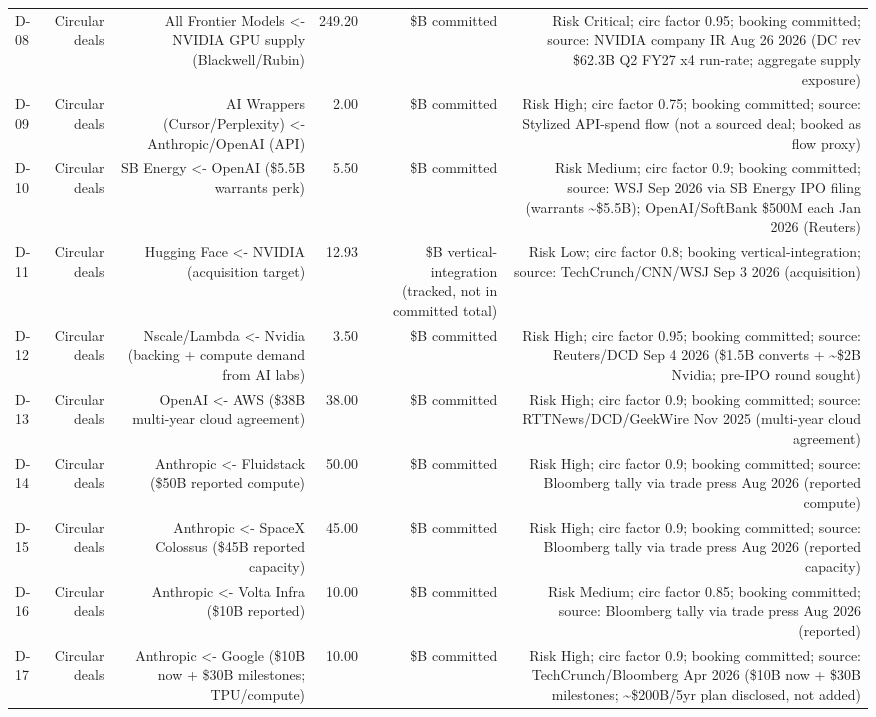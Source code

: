 \begin{tabular}{@{}lrrrrr@{}}
D-08 & Circular deals & All Frontier Models <- NVIDIA GPU supply (Blackwell/Rubin) & 249.20 & \$B committed & Risk Critical; circ factor 0.95; booking committed; source: NVIDIA company IR Aug 26 2026 (DC rev \$62.3B Q2 FY27 x4 run-rate; aggregate supply exposure) \\
D-09 & Circular deals & AI Wrappers (Cursor/Perplexity) <- Anthropic/OpenAI (API) & 2.00 & \$B committed & Risk High; circ factor 0.75; booking committed; source: Stylized API-spend flow (not a sourced deal; booked as flow proxy) \\
D-10 & Circular deals & SB Energy <- OpenAI (\$5.5B warrants perk) & 5.50 & \$B committed & Risk Medium; circ factor 0.9; booking committed; source: WSJ Sep 2026 via SB Energy IPO filing (warrants \textasciitilde{}\$5.5B); OpenAI/SoftBank \$500M each Jan 2026 (Reuters) \\
D-11 & Circular deals & Hugging Face <- NVIDIA (acquisition target) & 12.93 & \$B vertical-integration (tracked, not in committed total) & Risk Low; circ factor 0.8; booking vertical-integration; source: TechCrunch/CNN/WSJ Sep 3 2026 (acquisition) \\
D-12 & Circular deals & Nscale/Lambda <- Nvidia (backing + compute demand from AI labs) & 3.50 & \$B committed & Risk High; circ factor 0.95; booking committed; source: Reuters/DCD Sep 4 2026 (\$1.5B converts + \textasciitilde{}\$2B Nvidia; pre-IPO round sought) \\
D-13 & Circular deals & OpenAI <- AWS (\$38B multi-year cloud agreement) & 38.00 & \$B committed & Risk High; circ factor 0.9; booking committed; source: RTTNews/DCD/GeekWire Nov 2025 (multi-year cloud agreement) \\
D-14 & Circular deals & Anthropic <- Fluidstack (\$50B reported compute) & 50.00 & \$B committed & Risk High; circ factor 0.9; booking committed; source: Bloomberg tally via trade press Aug 2026 (reported compute) \\
D-15 & Circular deals & Anthropic <- SpaceX Colossus (\$45B reported capacity) & 45.00 & \$B committed & Risk High; circ factor 0.9; booking committed; source: Bloomberg tally via trade press Aug 2026 (reported capacity) \\
D-16 & Circular deals & Anthropic <- Volta Infra (\$10B reported) & 10.00 & \$B committed & Risk Medium; circ factor 0.85; booking committed; source: Bloomberg tally via trade press Aug 2026 (reported) \\
D-17 & Circular deals & Anthropic <- Google (\$10B now + \$30B milestones; TPU/compute) & 10.00 & \$B committed & Risk High; circ factor 0.9; booking committed; source: TechCrunch/Bloomberg Apr 2026 (\$10B now + \$30B milestones; \textasciitilde{}\$200B/5yr plan disclosed, not added) \\

\end{tabular}
